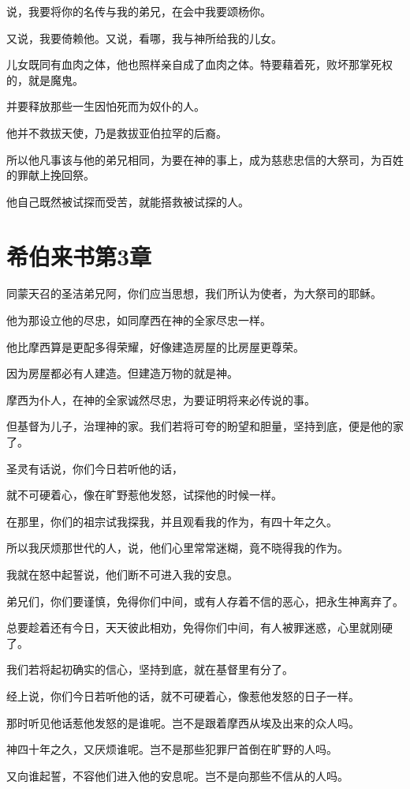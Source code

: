 \documentclass[12pt,oneside]{book}
\begin{document}
说，我要将你的名传与我的弟兄，在会中我要颂杨你。

又说，我要倚赖他。又说，看哪，我与神所给我的儿女。

儿女既同有血肉之体，他也照样亲自成了血肉之体。特要藉着死，败坏那掌死权的，就是魔鬼。

并要释放那些一生因怕死而为奴仆的人。

他并不救拔天使，乃是救拔亚伯拉罕的后裔。

所以他凡事该与他的弟兄相同，为要在神的事上，成为慈悲忠信的大祭司，为百姓的罪献上挽回祭。

他自己既然被试探而受苦，就能搭救被试探的人。

\chapter{希伯来书第3章}
同蒙天召的圣洁弟兄阿，你们应当思想，我们所认为使者，为大祭司的耶稣。

他为那设立他的尽忠，如同摩西在神的全家尽忠一样。

他比摩西算是更配多得荣耀，好像建造房屋的比房屋更尊荣。

因为房屋都必有人建造。但建造万物的就是神。

摩西为仆人，在神的全家诚然尽忠，为要证明将来必传说的事。

但基督为儿子，治理神的家。我们若将可夸的盼望和胆量，坚持到底，便是他的家了。

圣灵有话说，你们今日若听他的话，

就不可硬着心，像在旷野惹他发怒，试探他的时候一样。

在那里，你们的祖宗试我探我，并且观看我的作为，有四十年之久。

所以我厌烦那世代的人，说，他们心里常常迷糊，竟不晓得我的作为。

我就在怒中起誓说，他们断不可进入我的安息。

弟兄们，你们要谨慎，免得你们中间，或有人存着不信的恶心，把永生神离弃了。

总要趁着还有今日，天天彼此相劝，免得你们中间，有人被罪迷惑，心里就刚硬了。

我们若将起初确实的信心，坚持到底，就在基督里有分了。

经上说，你们今日若听他的话，就不可硬着心，像惹他发怒的日子一样。

那时听见他话惹他发怒的是谁呢。岂不是跟着摩西从埃及出来的众人吗。

神四十年之久，又厌烦谁呢。岂不是那些犯罪尸首倒在旷野的人吗。

又向谁起誓，不容他们进入他的安息呢。岂不是向那些不信从的人吗。
\end{document}
